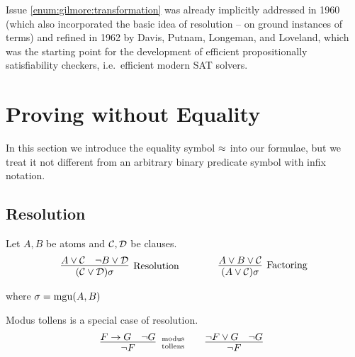 Issue \ref{enum:gilmore:transformation} was already implicitly 
addressed in 1960 \cite{Davis:1960:CPQ:321033.321034}
(which also incorporated the basic idea of resolution -- on ground instances of terms)
and refined in 1962 \cite{Davis:1962:MPT:368273.368557}
by Davis, Putnam, Longeman, and Loveland, 
which was the starting point for the development of efficient propositionally satisfiability checkers, i.e.~efficient modern SAT solvers.


\section{Proving without Equality}

In this section we introduce the equality symbol $\approx$ into our formulae, 
but we treat it not different from an arbitrary binary predicate symbol with infix notation. 

\subsection{Resolution}

\begin{definition}\label{def:resolution} Let $A, B$ be atoms and ${\mathcal C},{\mathcal D}$ be clauses.
	\begin{gather*}
	\infer
	[\text{Resolution}] 
	{(\mcC\lor\mcD)\sigma}
	{A\lor\mcC&\lnot B\lor\mcD}
	\qquad\qquad
	\infer
	[\text{Factoring}] 
	{(A\lor\mcC)\sigma}
	{A\lor B\lor\mcC}
	\end{gather*}
	\begin{center}
		where
		$\sigma=\operatorname{mgu}(A,B)$
	\end{center}
\end{definition}

\begin{example}Modus tollens is a special case of resolution.
	\begin{gather*}
	\infer[\text{modus}\atop\text{tollens}]{\lnot F}{F\limp G & \lnot G}
	\qquad
	\infer[]{\lnot F}{\lnot F\lor G & \lnot G}
	\end{gather*}
\end{example}



